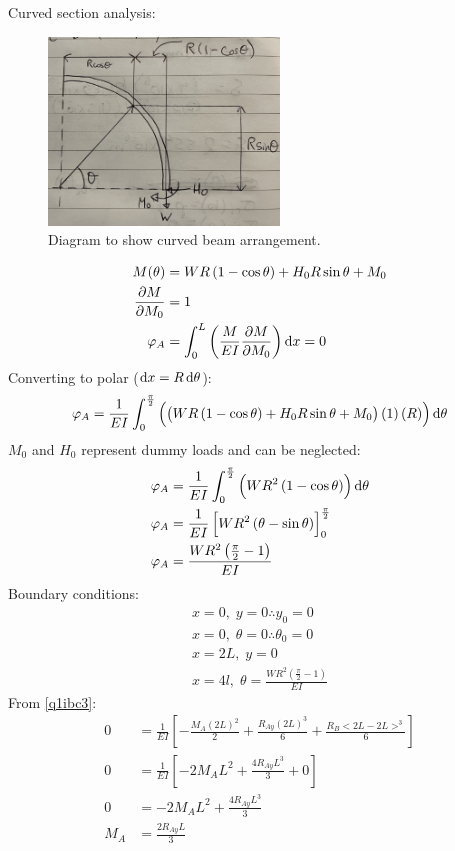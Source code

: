 \documentclass[11pt]{article}
\numberwithin{equation}{section}
\begin{document}
Curved section analysis:
\begin{figure}[H]
    \centering
    \includegraphics[height = 5cm]{./img/q1ii.jpg}
    \caption{Diagram to show curved beam arrangement.}
    \label{fig:q1ii}
\end{figure}
\begin{align}
    M(\theta) &= WR\left(1 - \cos \theta\right) + H_0 R \sin\theta + M_0\\
    \frac{\partial M}{\partial M_0} &= 1\\
    \varphi_A &= \int_0^L \left(\frac{M}{EI}\frac{\partial M}{\partial M_0}\right)\dif x = 0
\end{align}
Converting to polar ($\dif x = R \dif \theta$):
\begin{align}
    \varphi_A = \frac{1}{EI}\int_0^{\frac{\pi}{2}} \left( \left(WR \left(1-\cos \theta\right)+H_0 R\sin\theta + M_0 \right)\left(1\right)\left(R\right) \right)\dif \theta
\end{align}
$M_0$ and $H_0$ represent dummy loads and can be neglected:
\begin{align}
    \varphi_A &= \frac{1}{EI}\int_0^{\frac{\pi}{2}} \left(WR^2\left(1-\cos\theta\right)\right)\dif \theta\\
    \varphi_A &= \frac{1}{EI} \left[WR^2\left(\theta-\sin\theta\right)\right]^{\frac{\pi}{2}}_0\\
    \varphi_A &= \frac{WR^2\left(\frac{\pi}{2}-1\right)}{EI}
\end{align}
Boundary conditions:
\begin{gather}
    x = 0, \; y = 0 \therefore y_0 = 0\\
    x = 0, \; \theta = 0 \therefore \theta_0 = 0\\
    x = 2L, \; y = 0 \label{q1ibc3}\\
    x = 4l, \; \theta = \frac{WR^2\left(\frac{\pi}{2}-1\right)}{EI} \label{q1ibc4}
\end{gather}
From \ref{q1ibc3}:
\begin{align}
    0 &= \frac{1}{EI} \left[-\frac{M_A\left(2L\right)^2}{2} + \frac{R_{Ay}\left(2L\right)^3}{6} + \frac{R_B <2L - 2L>^3}{6}\right]\\
    0 &= \frac{1}{EI} \left[-2M_A L^2 + \frac{4R_{Ay}L^3}{3} + 0\right]\\
    0 &= -2M_AL^2 + \frac{4R_{Ay}L^3}{3}\\
    M_A &= \frac{2R_{Ay}L}{3} \label{q1iMA}
\end{align}
\end{document}
